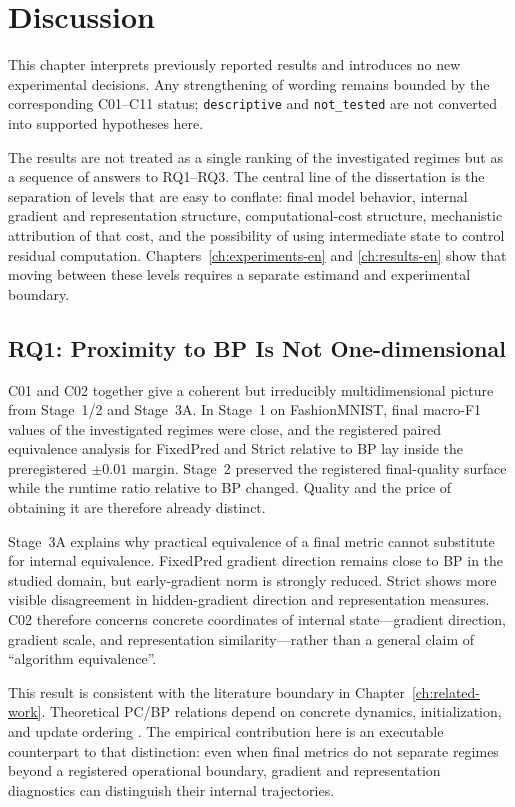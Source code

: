 \chapter{Discussion}
\label{ch:discussion}

This chapter interprets previously reported results and introduces no new experimental
decisions. Any strengthening of wording remains bounded by the corresponding C01--C11
status; \texttt{descriptive} and \texttt{not\_tested} are not converted into supported
hypotheses here.

The results are not treated as a single ranking of the investigated regimes but as a
sequence of answers to RQ1--RQ3. The central line of the dissertation is the separation
of levels that are easy to conflate: final model behavior, internal gradient and
representation structure, computational-cost structure, mechanistic attribution of
that cost, and the possibility of using intermediate state to control residual
computation. Chapters~\ref{ch:experiments-en} and \ref{ch:results-en} show that moving
between these levels requires a separate estimand and experimental boundary.

\section{RQ1: Proximity to BP Is Not One-dimensional}
\label{sec:discussion-rq1-en}

C01 and C02 together give a coherent but irreducibly multidimensional picture from
Stage~1/2 and Stage~3A. In Stage~1 on FashionMNIST, final macro-F1 values of the
investigated regimes were close, and the registered paired equivalence analysis for
FixedPred and Strict relative to BP lay inside the preregistered \(\pm0.01\) margin.
Stage~2 preserved the registered final-quality surface while the runtime ratio relative
to BP changed. Quality and the price of obtaining it are therefore already distinct.

Stage~3A explains why practical equivalence of a final metric cannot substitute for
internal equivalence. FixedPred gradient direction remains close to BP in the studied
domain, but early-gradient norm is strongly reduced. Strict shows more visible
disagreement in hidden-gradient direction and representation measures. C02 therefore
concerns concrete coordinates of internal state---gradient direction, gradient scale,
and representation similarity---rather than a general claim of ``algorithm
equivalence''.

This result is consistent with the literature boundary in Chapter~\ref{ch:related-work}.
Theoretical PC/BP relations depend on concrete dynamics, initialization, and update
ordering \cite{whittington2017approximation,song2020exact,millidge2022arbitrary,
rosenbaum2022relationship,rosenbaum2025correction}. The empirical contribution here is
an executable counterpart to that distinction: even when final metrics do not separate
regimes beyond a registered operational boundary, gradient and representation
diagnostics can distinguish their internal trajectories.

